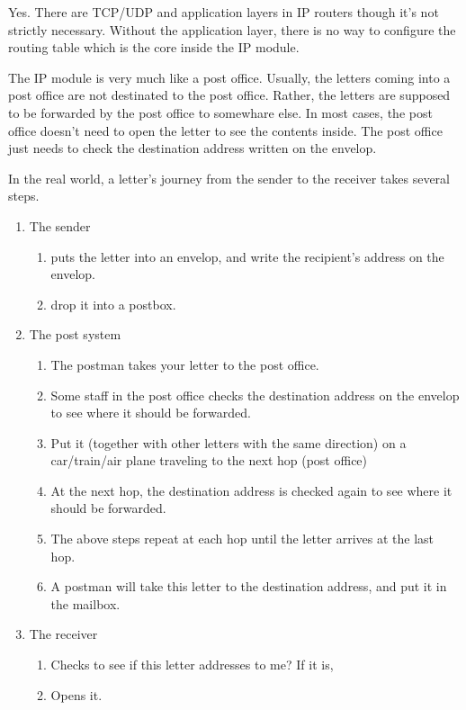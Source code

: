 \documentclass{article}
\begin{document}
Yes. There are TCP/UDP and application layers in IP routers though it's not strictly
necessary. Without the application layer, there is no way to configure the routing table
which is the core inside the IP module.

The IP module is very much like a post office. Usually, the letters coming into a post
office are not destinated to the post office. Rather, the letters are supposed to be
forwarded by the post office to somewhare else. In most cases, the post office doesn't need
to open the letter to see the contents inside. The post office just needs to check the
destination address written on the envelop.

In the real world, a letter's journey from the sender to the receiver takes several steps.
\begin{enumerate}
\item The sender
  \begin{enumerate}
  \item puts the letter into an envelop, and write the recipient's address on the
    envelop.
  \item drop it into a postbox.
  \end{enumerate}
\item The post system
  \begin{enumerate}
  \item The postman takes your letter to the post office.
  \item Some staff in the post office checks the destination address on the envelop to see
    where it should be forwarded.
  \item Put it (together with other letters with the same direction) on a car/train/air
    plane traveling to the next hop (post office)
  \item At the next hop, the destination address is checked again to see where it should
    be forwarded.
  \item The above steps repeat at each hop until the letter arrives at the last hop.
  \item A postman will take this letter to the destination address, and put it in the mailbox.
  \end{enumerate}
\item The receiver
  \begin{enumerate}
  \item Checks to see if this letter addresses to me? If it is,
  \item Opens it.
  \end{enumerate}
\end{enumerate}
\end{document}
